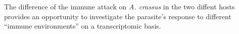 


\begin{abstracts}        %

The difference of the immune attack on \textit{A. crassus} in the two
diffent hosts provides an opportunity to investigate the parasite's
response to different ``immune environments'' on a transcriptomic
basis.


\end{abstracts}


